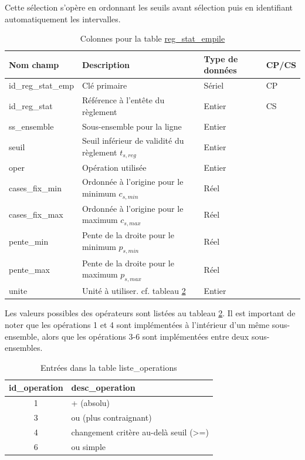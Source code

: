             Cette sélection s'opère en ordonnant les seuils avant sélection puis en identifiant automatiquement les intervalles. \begin{table}[H]
                \caption{Colonnes pour la table \underline{reg\_stat\_empile}}
            \label{tab:definition_reg_stat_emp}
            \centering
            \begin{tabular}{m{}|m{}m{}m{}}
                    \hline
                    Nom champ & Description & Type de données & CP/CS  \\
                    \hline
                    id\_reg\_stat\_emp & Clé primaire  & Sériel & CP \\ 
                    id\_reg\_stat & Référence à l'entête du règlement & Entier & CS \\ 
                    ss\_ensemble & Sous-ensemble pour la ligne & Entier & \\ 
                    seuil & Seuil inférieur de validité du règlement $t_{s,reg}$& Entier & \\ 
                    oper  & Opération utilisée  & Entier & \\
                    cases\_fix\_min & Ordonnée à l'origine pour le minimum $c_{s,min}$ & Réel & \\
                    cases\_fix\_max & Ordonnée à l'origine pour le maximum $c_{s,max}$ & Réel & \\ 
                    pente\_min & Pente de la droite pour le minimum $p_{s,min}$ & Réel & \\
                    pente\_max & Pente de la droite pour le maximum $p_{s,max}$& Réel & \\
                    unite & Unité à utiliser. cf. tableau \ref{tab:operations_table} & Entier & \\
                    \hline
            \end{tabular}
            
            \end{table}    
            Les valeurs possibles des opérateurs sont listées au tableau \ref{tab:operations_table}. Il est important de noter que les opérations 1 et 4 sont implémentées à l'intérieur d'un même sous-ensemble, alors que les opérations 3-6 sont implémentées entre deux sous-ensembles.\par
            \begin{table}[H]
                \caption{Entrées dans la table liste\_operations}
                \label{tab:operations_table}
                \centering
                \begin{tabular}{cl}
                    \hline
                    id\_operation & desc\_operation  \\ \hline
                    1 & + (absolu)\\
                    3 & ou (plus contraignant) \\
                    4 & changement critère au-delà seuil (>=)\\
                    6 & ou simple \\ \hline
                \end{tabular}
            \end{table}
